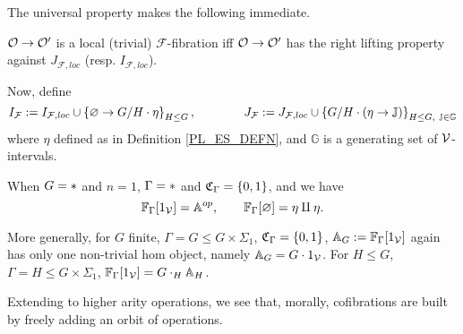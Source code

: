 \documentclass[a4paper,10pt
,draft
]{article}%
\renewcommand{\F}{\mathcal F}
\newcommand{\J}{\mathbb J}
\renewcommand{\1}{\eta}%
\begin{document}
The universal property makes the following immediate.
\begin{corollary}
      $\mathcal{O} \to \mathcal{O}'$ is a local (trivial) $\F$-fibration iff
      $\mathcal{O} \to \mathcal{O}'$ has the right lifting property against $J_{\F, loc}$ (resp. $I_{\F, loc}$).
\end{corollary}

Now, define
\begin{equation}
      I_{\F}:= I_{\F, loc} \mathbin{\cup} \set{\varnothing \to G/H \cdot \1}_{H\leq G},
      \qquad \qquad
      J_{\F} := J_{\F, loc} \mathbin{\cup} \set{G/H \cdot (\1 \to \J)}_{H\leq G,\ \J\in\mathbb{G}}
\end{equation}
where $\1$ defined as in Definition \ref{PL_ES_DEFN}, and $\mathbb{G}$ is a generating set of $\mathcal V$-intervals. 


\begin{example}
      When $G = \**$ and $n=1$, $\Gamma = \**$ and $\mathfrak C_\Gamma = \left\{0,1\right\}$, and we have
      \[
            \mathbb F_{\Gamma}[1_{\mathcal V}] = \mathbb A^{op}, \qquad \mathbb F_{\Gamma}[\varnothing] = \eta \amalg \eta.
      \]

      More generally, for $G$ finite, $\Gamma = G \leq G \times \Sigma_1$, $\mathfrak C_\Gamma = \left\{0,1\right\}$,
      $\mathbb A_G := \mathbb F_{\Gamma}[1_{\mathcal V}]$ again has only one non-trivial hom object, namely
      $\mathbb A_G = G \cdot 1_{\mathcal V}$.
      For $H \leq G$, $\Gamma = H \leq G \times \Sigma_1$, $\mathbb F_{\Gamma}[1_{\mathcal V}] = G \cdot_H \mathbb A_H$.

      Extending to higher arity operations, we see that,
      morally, cofibrations are built by freely adding an orbit of operations.
\end{example}
\end{document}
